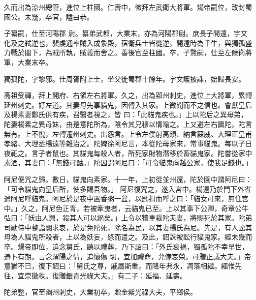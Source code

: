 \begin{pinyinscope}
 久而出為涼州總管，進位上柱國。仁壽中，徵拜左武衛大將軍。煬帝嗣位，改封蜀國公。未幾，卒官，謚曰恭。



 子纂嗣，仕至河陽郡
 尉。纂弟武都，大業末，亦為河陽郡尉。庶長子開遠，宇文化及之弒逆也，裴虔通率賊入成象殿，宿衛兵士皆從逆，開遠時為千牛，與獨孤盛力戰於閤下，為賊所執，賊義而舍之。善後官至柱國。卒，子覽嗣，仕至左候衛將軍，大業末卒。



 獨孤陀，字黎邪。仕周胥附上士，坐父徙蜀郡十餘年。宇文護被誅，始歸長安。



 高祖受禪，拜上開府、右領左右將軍。久之，出為郢州刺史，進位上大將軍，累轉延州刺史。好左道。其妻母先事貓鬼，因轉入其家。上微聞而不之信也。會獻皇后及楊素妻鄭氏俱有疾，召醫者視之，皆
 曰：「此貓鬼疾也。」上以陀后之異母弟，陀妻楊素之異母妹，由是意陀所為，陰令其兄穆以情喻之。上又避左右諷陀，陀言無有。上不悅，左轉遷州刺史。出怨言。上令左僕射高熲、納言蘇威、大理正皇甫孝緒、大理丞楊遠等雜治之。陀婢徐阿尼言，本從陀母家來，常事貓鬼。每以子日夜祀之。言子者鼠也。其貓鬼每殺人者，所死家財物潛移於畜貓鬼家。陀嘗從家中素酒，其妻曰：「無錢可酤。」陀因謂阿尼曰：「可令貓鬼向越公家，使我足錢也。」



 阿尼便咒之歸。數日，貓鬼向素家。十一年，上初從並州還，陀於園中謂阿尼曰：「可令貓鬼向皇后所，使多賜吾物。」
 阿尼復咒之，遂入宮中。楊遠乃於門下外省遣阿尼呼貓鬼。阿尼於是夜中置香粥一盆，以匙扣而呼之曰：「貓女可來，無住宮中。」久之，阿尼色正青，若被牽曳者，云貓鬼已至。上以其事下公卿，奇章公牛弘曰：「妖由人興，殺其人可以絕矣。」上令以犢車載陀夫妻，將賜死於其家。陀弟司勛侍中整詣闕求哀，於是免陀死，除名為民，以其妻楊氏為尼。先是，有人訟其母為人貓鬼所殺者，上以為妖妄，怒而遣之。及此，詔誅被訟行貓鬼家。經未幾而卒。煬帝即位，追念舅氏，聽以禮葬，乃下詔曰：「外氏衰禍，獨孤陀不幸早世，遷卜有期。言念渭陽之情，追懷傷
 切，宜加禮命，允備哀榮。可贈正議大夫。」帝意猶不已，復下詔曰：「舅氏之尊，戚屬斯重，而降年弗永，凋落相繼。緬惟先往，宜崇徽秩。復贈銀青光祿大夫。」有二子：延福、延壽。



 陀弟整，官至幽州刺史，大業初卒，贈金紫光祿大夫，平鄉侯。




\end{pinyinscope}
